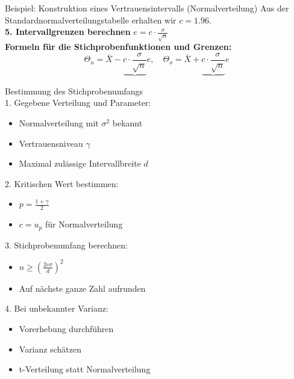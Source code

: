 \begin{example2}{Beispiel: Konstruktion eines Vertrauensintervalls (Normalverteilung)}
Aus der Standardnormalverteilungstabelle erhalten wir $c=1.96$.
\vspace{2mm}\\
\textbf{5. Intervallgrenzen berechnen} $e=c \cdot \frac{\sigma}{\sqrt{n}}$
\vspace{2mm}\\
\textbf{Formeln für die Stichprobenfunktionen und Grenzen:}
$$
\Theta_u=\bar{X}-\underbrace{c \cdot \frac{\sigma}{\sqrt{n}}}{e}, \quad \Theta_o=\bar{X}+\underbrace{c \cdot \frac{\sigma}{\sqrt{n}}}{e}
$$
\end{example2}



\begin{KR}{Bestimmung des Stichprobenumfangs}\\
1. Gegebene Verteilung und Parameter:
   \begin{itemize}
     \item Normalverteilung mit $\sigma^2$ bekannt
     \item Vertrauensniveau $\gamma$
     \item Maximal zulässige Intervallbreite $d$
   \end{itemize}

2. Kritischen Wert bestimmen:
   \begin{itemize}
     \item $p = \frac{1+\gamma}{2}$
     \item $c = u_p$ für Normalverteilung
   \end{itemize}

3. Stichprobenumfang berechnen:
   \begin{itemize}
     \item $n \geq (\frac{2c\sigma}{d})^2$
     \item Auf nächste ganze Zahl aufrunden
   \end{itemize}

4. Bei unbekannter Varianz:
   \begin{itemize}
     \item Vorerhebung durchführen
     \item Varianz schätzen
     \item t-Verteilung statt Normalverteilung
   \end{itemize}
\end{KR}

